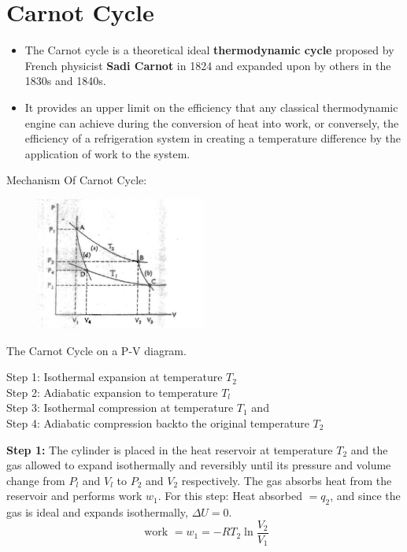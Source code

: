 \documentclass[a4paper,12pt,twocolumn]{article}
\begin{document}
\section{Carnot Cycle}
\begin{itemize}
\item The Carnot cycle is a theoretical ideal \textbf{thermodynamic cycle} proposed by French physicist \textbf{Sadi Carnot} in 1824 and expanded upon by others in the 1830s and 1840s. 
\item It provides an upper limit on the efficiency that any classical thermodynamic engine can achieve during the conversion of heat into work, or conversely, the efficiency of a refrigeration system in creating a temperature difference by the application of work to the system. 
\end{itemize}
{\large Mechanism Of Carnot Cycle:}
\begin{figure}[h]
\centering
\includegraphics[width=0.5\textwidth]{Screenshot 2023-03-27 003237.png}
\end{figure}
\begin{center}
The Carnot Cycle on a P-V diagram.
\end{center}
\begin{Box1}{}
\small
Step 1: Isothermal expansion at temperature $T_2$\\
Step 2: Adiabatic expansion to temperature $T_l$\\
Step 3: Isothermal compression at temperature $T_1$ and\\
Step 4: Adiabatic compression backto the original temperature $T_2$
\end{Box1}
\textbf{Step 1:} The cylinder is placed in the heat reservoir at temperature $T_2$ and the gas allowed to expand isothermally and reversibly until its pressure and volume change from $P_l$ and $V_l$ to $P_2$ and $V_2$ respectively. The gas absorbs heat from the reservoir and performs work $w_1$. For this step:
Heat absorbed $=q_2$, and since the gas is ideal and expands isothermally, $\Delta U=0$.
$$
\text { work }=w_1=-R T_2 \ln  \dfrac{V_2}{V_1}
$$
\end{document}
